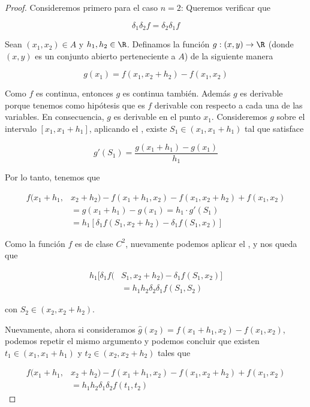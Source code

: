\begin{proof}
    Consideremos primero para el caso $n = 2$: Queremos verificar que
    
    \[
    \delta_1\delta_2f = \delta_2\delta_1f
    \]
    
    Sean $(x_1, x_2) \in A$ y $h_1, h_2 \in \R$. Definamos la función $g: (x,y) \rightarrow \R$ (donde $(x,y)$ es un conjunto abierto perteneciente a $A$) de la siguiente manera
    
    \[
    g(x_1) = f(x_1, x_2 + h_2) - f(x_1, x_2)
    \]
    
    Como $f$ es continua, entonces $g$ es continua también. Además $g$ es derivable porque tenemos como hipótesis que es $f$ derivable con respecto a cada una de las variables. En consecuencia, $g$ es derivable en el punto $x_1$. Consideremos $g$ sobre el intervalo $[x_1, x_1 + h_1]$, aplicando el \TVM, existe $S_1 \in (x_1, x_1 + h_1)$ tal que satisface
    
    \[
    g'(S_1) = \frac{g(x_1 + h_1) - g(x_1)}{h_1}
    \]
    
    Por lo tanto, tenemos que
    
    \begin{align*}
        f(x_1 + h_1, &x_2 + h_2) - f(x_1 + h_1, x_2) - f(x_1, x_2 + h_2) + f(x_1, x_2) \\
            &= g(x_1 + h_1) - g(x_1) = h_1 \cdot g'(S_1) \\
            &= h_1 \left[ \delta_1 f(S_1, x_2 + h_2) - \delta_1 f(S_1, x_2) \right]
    \end{align*}
    
    Como la función $f$ es de clase $C^2$, nuevamente podemos aplicar el \TVM, y nos queda que
    
    \begin{align}\label{eq:1.2.1}
        h_1 \big[ \delta_1 f(&S_1, x_2 + h_2) - \delta_1 f(S_1, x_2) \big] \nonumber \\
            &= h_1h_2 \delta_2\delta_1 f(S_1, S_2)
    \end{align}
    
    \noindent con $S_2 \in (x_2, x_2 + h_2)$.
    
    Nuevamente, ahora si consideramos $\hat{g}(x_2) = f(x_1 + h_1, x_2) - f(x_1, x_2)$, podemos repetir el mismo argumento y podemos concluir que existen $t_1 \in (x_1, x_1 + h_1)$ y $t_2 \in (x_2, x_2 + h_2)$ tales que
    
    \begin{align}\label{eq:1.2.2}
        f(x_1 + h_1, &x_2 + h_2) - f(x_1 + h_1, x_2) - f(x_1, x_2 + h_2) + f(x_1, x_2) \nonumber \\
            &= h_1h_2 \delta_1\delta_2 f(t_1, t_2)
    \end{align}
    

\end{proof}

